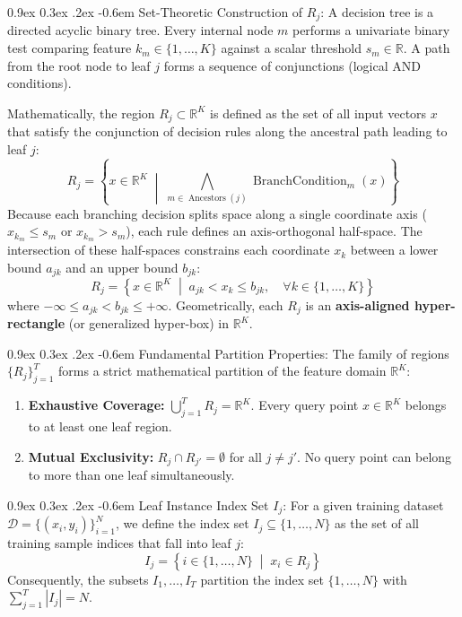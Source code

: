 \documentclass[11pt,a4paper]{article}
\makeatletter
\renewcommand\paragraph{\@startsection{paragraph}{4}{\z@}%
                                     {0.9ex \@plus0.3ex \@minus.2ex}%
                                     {-0.6em}%
                                     {\normalfont\normalsize\bfseries}}
\newcommand{\R}{\mathbb{R}}
\makeatother
\begin{document}
\paragraph{Set-Theoretic Construction of $R_j$:}
A decision tree is a directed acyclic binary tree. Every internal node $m$ performs a univariate binary test comparing feature $k_m \in \{1, \dots, K\}$ against a scalar threshold $s_m \in \R$. A path from the root node to leaf $j$ forms a sequence of conjunctions (logical $\text{AND}$ conditions). 

Mathematically, the region $R_j \subset \R^K$ is defined as the set of all input vectors $x$ that satisfy the conjunction of decision rules along the ancestral path leading to leaf $j$:
\begin{equation}
    R_j = \left\{ x \in \R^K \;\middle|\; \bigwedge_{m \in \operatorname{Ancestors}(j)} \operatorname{BranchCondition}_m(x) \right\}
\end{equation}
Because each branching decision splits space along a single coordinate axis ($x_{k_m} \le s_m$ or $x_{k_m} > s_m$), each rule defines an axis-orthogonal half-space. The intersection of these half-spaces constrains each coordinate $x_k$ between a lower bound $a_{jk}$ and an upper bound $b_{jk}$:
\begin{equation}
    R_j = \left\{ x \in \R^K \;\middle|\; a_{jk} < x_k \le b_{jk}, \quad \forall k \in \{1, \dots, K\} \right\}
\end{equation}
where $-\infty \le a_{jk} < b_{jk} \le +\infty$. Geometrically, each $R_j$ is an \textbf{axis-aligned hyper-rectangle} (or generalized hyper-box) in $\R^K$.

\paragraph{Fundamental Partition Properties:}
The family of regions $\{R_j\}_{j=1}^T$ forms a strict mathematical partition of the feature domain $\R^K$:
\begin{enumerate}
    \item \textbf{Exhaustive Coverage:} $\bigcup_{j=1}^T R_j = \R^K$. Every query point $x \in \R^K$ belongs to at least one leaf region.
    \item \textbf{Mutual Exclusivity:} $R_j \cap R_{j'} = \emptyset$ for all $j \neq j'$. No query point can belong to more than one leaf simultaneously.
\end{enumerate}

\paragraph{Leaf Instance Index Set $I_j$:}
For a given training dataset $\mathcal{D} = \{(x_i, y_i)\}_{i=1}^N$, we define the index set $I_j \subseteq \{1, \dots, N\}$ as the set of all training sample indices that fall into leaf $j$:
\begin{equation}
    I_j = \left\{ i \in \{1, \dots, N\} \;\middle|\; x_i \in R_j \right\}
\end{equation}
Consequently, the subsets $I_1, \dots, I_T$ partition the index set $\{1, \dots, N\}$ with $\sum_{j=1}^T |I_j| = N$.
\end{document}

